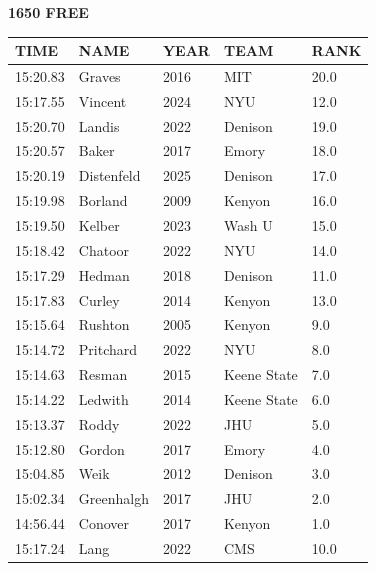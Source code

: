 \begin{table}[H]
\centering
\begin{minipage}[t]{0.6\textwidth}
\centering
\textbf{1650 FREE}\\[0.1cm]
\begin{tabular}{@{}p{1.8cm}p{2.8cm}p{1.2cm}p{1.4cm}p{0.8cm}@{}}
\hline
    \textbf{TIME} & \textbf{NAME} & \textbf{YEAR} & \textbf{TEAM} & \textbf{RANK} \\
\hline
    15:20.83 & Graves & 2016 & MIT & 20.0 \\
    15:17.55 & Vincent & 2024 & NYU & 12.0 \\
    15:20.70 & Landis & 2022 & Denison & 19.0 \\
    15:20.57 & Baker & 2017 & Emory & 18.0 \\
    15:20.19 & Distenfeld & 2025 & Denison & 17.0 \\
    15:19.98 & Borland & 2009 & Kenyon & 16.0 \\
    15:19.50 & Kelber & 2023 & Wash U & 15.0 \\
    15:18.42 & Chatoor & 2022 & NYU & 14.0 \\
    15:17.29 & Hedman & 2018 & Denison & 11.0 \\
    15:17.83 & Curley & 2014 & Kenyon & 13.0 \\
    15:15.64 & Rushton & 2005 & Kenyon & 9.0 \\
    15:14.72 & Pritchard & 2022 & NYU & 8.0 \\
    15:14.63 & Resman & 2015 & Keene State & 7.0 \\
    15:14.22 & Ledwith & 2014 & Keene State & 6.0 \\
    15:13.37 & Roddy & 2022 & JHU & 5.0 \\
    15:12.80 & Gordon & 2017 & Emory & 4.0 \\
    15:04.85 & Weik & 2012 & Denison & 3.0 \\
    15:02.34 & Greenhalgh & 2017 & JHU & 2.0 \\
    14:56.44 & Conover & 2017 & Kenyon & 1.0 \\
    15:17.24 & Lang & 2022 & CMS & 10.0 \\
\hline
\end{tabular}
\end{minipage}
\end{table}


